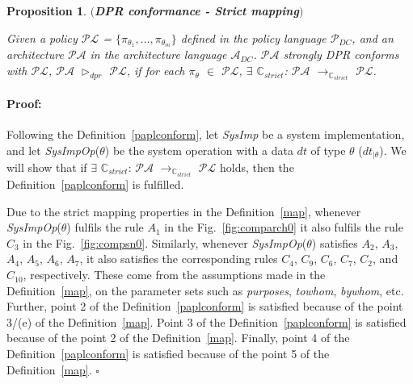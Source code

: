 \documentclass[a4paper]{article}
\newtheorem{ttpp}{Proposition}
\newenvironment{proof}{\paragraph{Proof:}}{\hfill$\square$}
\begin{document}
\begin{ttpp}\label{prop:1} $($\textbf{DPR conformance - Strict mapping}$)$

\noindent Given a policy $\mathcal{P}\mathcal{L}$ = $\{\pi_{\theta_1}, \dots, \pi_{\theta_m}\}$ defined in the policy language $\mathcal{P}_{DC}$, and an   
architecture $\mathcal{P}\mathcal{A}$ in the architecture language $\mathcal{A}_{DC}$.  $\mathcal{P}\mathcal{A}$ strongly DPR conforms with  $\mathcal{P}\mathcal{L}$, $\mathcal{P}\mathcal{A}$ $\triangleright_{dpr}$ $\mathcal{P}\mathcal{L}$, if for each $\pi_{\theta}$ $\in$ $\mathcal{P}\mathcal{L}$, $\exists$ $\mathbb{C}_{strict}$: $\mathcal{P}\mathcal{A}$ $\rightarrow_{\mathbb{C}_{strict}}$ $\mathcal{P}\mathcal{L}$.
\end{ttpp}
\begin{proof}
Following  the Definition~\ref{paplconform}, let \textit{SysImp} be a system implementation, and let  \textit{SysImpOp}($\theta$) be the system operation with a data $dt$ of type $\theta$ ($dt_{|\theta}$).  
We will show that if $\exists$ $\mathbb{C}_{strict}$: $\mathcal{P}\mathcal{A}$ $\rightarrow_{\mathbb{C}_{strict}}$ $\mathcal{P}\mathcal{L}$ holds, then the Definition~\ref{paplconform} is fulfilled.

Due to the strict mapping properties in the Definition~\ref{map}, whenever \textit{SysImpOp}($\theta$) fulfils the rule $A_1$ in the Fig.~\ref{fig:comparch0} it also fulfils the rule $C_3$ in the Fig.~\ref{fig:compsn0}. Similarly, whenever \textit{SysImpOp}($\theta$) satisfies $A_2$, $A_3$, $A_4$,  $A_5$, $A_6$, $A_7$, it also satisfies the corresponding rules $C_4$, $C_{9}$,  $C_{6}$,  $C_{7}$, $C_{2}$, and $C_{10}$, respectively.    These come from the assumptions made in the Definition~\ref{map}, on the parameter sets such as \textit{purposes}, \textit{towhom}, \textit{bywhom}, etc. Further, point 2 of the Definition~\ref{paplconform} is satisfied because of the point 3/(e) of the Definition~\ref{map}. Point 3 of the Definition~\ref{paplconform} is satisfied because of the point 2 of the Definition~\ref{map}. Finally,  point 4 of the Definition~\ref{paplconform} is satisfied because of the point 5 of the Definition~\ref{map}. 
\end{proof}
\end{document}

